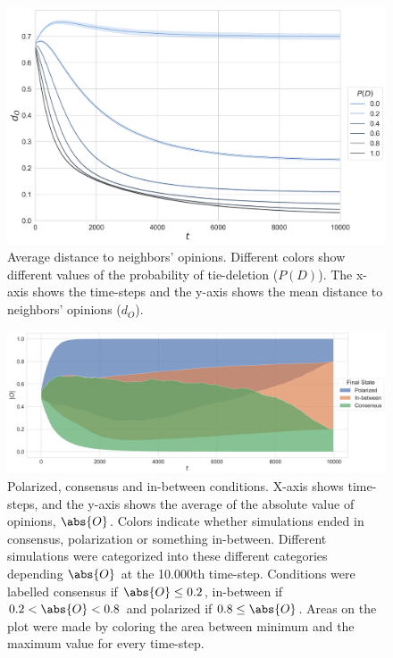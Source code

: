 \documentclass[11pt]{article}
\DeclarePairedDelimiter{\abs}\lvert\rvert
\begin{document}
\begin{figure}[H]
    \centering
    \includegraphics[width=.7\linewidth]{../plots/overall/Distance_Tie_Deletion.png}
  \caption{Average distance to neighbors' opinions. Different colors show different values of the probability of tie-deletion ($P(D)$). The x-axis shows the time-steps and the y-axis shows the mean distance to neighbors' opinions ($d_O$). }
  \label{appendix:distance}
\end{figure}

\begin{figure}[H]
    \centering
    \includegraphics[width=.98\linewidth]{../plots/overall/Point_Of_No_Return.png}
  \caption{Polarized, consensus and in-between conditions. X-axis shows time-steps, and the y-axis shows the average of the absolute value of opinions, $\abs{O}$. Colors indicate whether simulations ended in consensus, polarization or something in-between. Different simulations were categorized into these different categories depending $\abs{O}$ at the 10.000th time-step. Conditions were labelled consensus if $\abs{O} \leq 0.2$, in-between if $0.2 < \abs{O} < 0.8$ and polarized if $0.8 \leq \abs{O}$. Areas on the plot were made by coloring the area between minimum and the maximum value for every time-step.}
  \label{appendix:ponr}
\end{figure}
\end{document}
